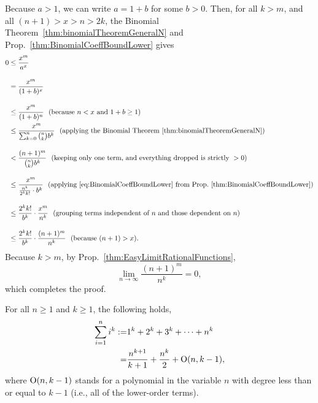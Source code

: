 Because $a>1$, we can write $a = 1 + b$ for some $b>0$. Then, for all $k >m$, and all $(n+1) > x > n > 2k$, the Binomial Theorem~\ref{thm:binomialTheoremGeneralN} and Prop.~\ref{thm:BinomialCoeffBoundLower} gives 
\begin{equation}
    \begin{aligned}
0 &\le \frac{x^m}{a^x} \\[1em]
 &=  \frac{x^m} {(1 + b)^x}\\[1em]
& \le  \frac{x^m} { (1 + b)^{n} } ~~(\text{because } n< x \text{ and } 1 + b \ge 1)\\
& \le  \frac{x^m}{ \sum_{k=0}^{n}\binom{n}{k} b^{k} } ~~(\text{applying the Binomial Theorem}~\ref{thm:binomialTheoremGeneralN}) \\[1em]
& < \frac{(n+1)^m}{ \binom{n}{k} b^k } ~~(\text{keeping only one term, and everything dropped is strictly } > 0)\\[1em]
& \le  \frac{ x^m }{\frac{n^k}{2^k k!} \cdot   b^k  } ~~(\text{applying } \eqref{eq:BinomialCoeffBoundLower} \text{ from Prop.}~\ref{thm:BinomialCoeffBoundLower})\\[1em]
 &  \le \frac{2^k k!}{ b^k }  \cdot \frac{x^m}{n^k} ~~(\text{grouping terms independent of } n \text{ and those dependent on } n)  \\[1em]
 &\le \frac{2^k k!}{ b^k }  \cdot \frac{(n+1)^m}{n^k} ~~(\text{because } (n+1) > x). 
    \end{aligned}
\end{equation}
Because $k > m$, by Prop.~\ref{thm:EasyLimitRationalFunctions},  $$\displaystyle{\lim_{n \to \infty} } \frac{(n+1)^m}{n^k} = 0,$$
which completes the proof. \Qed


\bigskip

\begin{tcolorbox}[title=\textcolor{black}{Sketch of the Proof of Prop.~\ref{thm:GeneralPowerSums} (Power Sums)}, sharp corners, colback=green!30, colframe=green!80!blue, breakable, fonttitle=\bfseries]
For all $n\ge 1$ and $k\ge 1$, the following holds,
\begin{equation}
    \begin{aligned}
      \sum_{i=1}^{n}i^k :=& 1^k + 2^k + 3^k + \cdots + n^k \\
      =& \frac{n^{k+1}}{k+1} + \frac{n^k}{2} + \mathrm{O}(n,k-1),
    \end{aligned}
\end{equation}
where $\mathrm{O}(n,k-1)$ stands for a polynomial in the variable $n$ with degree less than or equal to $k-1$ (i.e., all of the lower-order terms).    
\end{tcolorbox}


